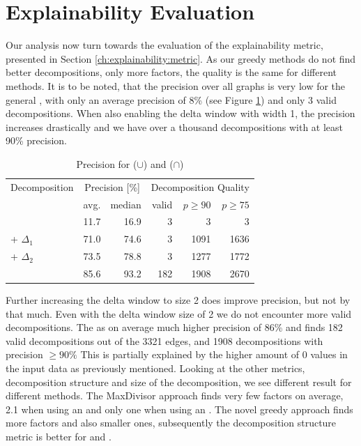 \section{Explainability Evaluation}
\label{ch:Evaluation:explainability}
Our analysis now turn towards the evaluation of the explainability metric, presented in Section \ref{ch:explainability:metric}.
As our greedy methods do not find better decompositions, only more factors, the quality is the same for different methods.
It is to be noted, that the precision over all graphs is very low for the general \orDecomp, with only an average precision of 8\% (see Figure \ref{tab:eval-precision}) and only 3 valid decompositions.
When also enabling the delta window with width 1, the precision increases drastically and we have over a thousand decompositions with at least 90\% precision. 
\begin{table}[h]
	\centering
	\begin{tabular}{l|rr|rrr}
		\multicolumn{1}{c}{Decomposition} & \multicolumn{2}{c}{Precision [\%]} & \multicolumn{3}{c}{Decomposition Quality} \\
		& avg. & median & valid & $p \geq 90$ & $p \geq 75$ \\
		\hline
		\orDecomp & 11.7 & 16.9 & 3 & 3 & 3 \\
		\orDecomp + $\Delta_1$ & 71.0 & 74.6 & 3 & 1091 & 1636 \\
		\orDecomp + $\Delta_2$ & 73.5 & 78.8 & 3 & 1277 & 1772 \\
		\andDecomp & 85.6 & 93.2 &  182 & 1908 & 2670\\
	\end{tabular}
	\caption{Precision for \orDecomp ($\cup$) and \andDecomp ($\cap$)}
	\label{tab:eval-precision}
\end{table}
Further increasing the delta window to size 2 does improve precision, but not by that much.
Even with the delta window size of 2 we do not encounter more valid decompositions.
The \andDecomp as on average much higher precision of 86\% and finds 182 valid decompositions out of the 3321 edges, and 1908 decompositions with precision $\geq 90\%$
This is partially explained by the higher amount of 0 values in the input data as previously mentioned.
Looking at the other metrics, decomposition structure and size of the decomposition, we see different result for different methods.
The MaxDivisor approach finds very few factors on average, 2.1 when using an \andDecomp and only one when using an \orDecomp.
The novel greedy approach finds more factors and also smaller ones, subsequently the decomposition structure metric is better for \andDecomp and \orDecomp.
